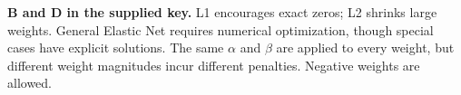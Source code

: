 \textbf{B and D in the supplied key.} L1 encourages exact zeros; L2 shrinks large weights. General Elastic Net requires numerical optimization, though special cases have explicit solutions. The same \ensuremath{\alpha} and \ensuremath{\beta} are applied to every weight, but different weight magnitudes incur different penalties. Negative weights are allowed.
